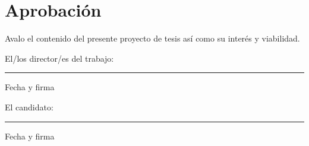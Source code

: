 \section*{Aprobación}
\label{sec:firmas}

Avalo el contenido del presente proyecto de tesis así como su interés y
viabilidad.

\vspace{2cm}
\noindent El/los director/es del trabajo:

\vspace{2.5cm}
\noindent\rule{7cm}{0.4pt}\par
Fecha y firma

\vspace{2cm}
\noindent El candidato:

\vspace{2.5cm}
\noindent\rule{7cm}{0.4pt}\par
Fecha y firma
